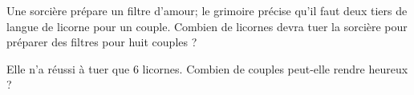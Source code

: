 
\begin{exercice}\label{exo2smath-0031}

    Une sorcière prépare un filtre d'amour; le grimoire précise qu'il faut deux tiers de langue de licorne pour un couple. Combien de licornes devra tuer la sorcière pour préparer des filtres pour huit couples ?

    Elle n'a réussi à tuer que \( 6\) licornes. Combien de couples peut-elle rendre heureux ?

\end{exercice}
